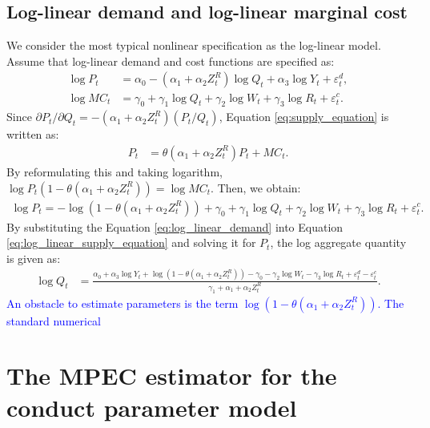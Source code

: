 \documentclass[11pt, a4paper]{article}
\begin{document}
\subsection{Log-linear demand and log-linear marginal cost}
We consider the most typical nonlinear specification as the log-linear model.
Assume that log-linear demand and cost functions are specified as:
\begin{align}
    \log P_{t} &= \alpha_0 - (\alpha_1 + \alpha_2 Z^{R}_{t}) \log Q_t + \alpha_3 \log Y_t + \varepsilon^{d}_{t},\label{eq:log_linear_demand}\\
    \log MC_t &= \gamma_0 + \gamma_1 \log Q_t +  \gamma_2 \log W_{t} + \gamma_3 \log R_t + \varepsilon^{c}_{t}.\label{eq:log_linear_marginal_cost}
\end{align}
Since $\partial P_t/\partial Q_t = - (\alpha_1 + \alpha_2 Z_{t}^R) (P_t/Q_t) $, Equation \eqref{eq:supply_equation} is written as:
\begin{align}
    P_t &= \theta (\alpha_1 + \alpha_2 Z^{R}_{t}) P_t + MC_t.
\end{align}
By reformulating this and taking logarithm, $\log P_t(1 -\theta (\alpha_1 + \alpha_2 Z^{R}_{t})) = \log MC_t.$
Then, we obtain:
\begin{align}
    \log P_t = - \log(1 - \theta(\alpha_1 + \alpha_2 Z^{R}_{t})) + \gamma_0 + \gamma_1 \log Q_t +  \gamma_2 \log W_{t} + \gamma_3 \log R_t + \varepsilon^{c}_{t}. \label{eq:log_linear_supply_equation}
\end{align}
By substituting the Equation \eqref{eq:log_linear_demand} into Equation \eqref{eq:log_linear_supply_equation} and solving it for $P_{t}$, the log aggregate quantity is given as: 
\begin{align}
    \log Q_t &= \frac{ \alpha_0 + \alpha_3 \log Y_t + \log (1 - \theta (\alpha_1 + \alpha_2 Z^{R}_{t})) - \gamma_0  -  \gamma_2 \log W_{t} - \gamma_3 \log R_t + \varepsilon^{d}_{t} - \varepsilon^{c}_{t}}{\gamma_1+ \alpha_1 + \alpha_2 Z^{R}_{t} }.\label{eq:quantity_loglinear}
\end{align}
\textcolor{blue}{An obstacle to estimate  parameters is the term $\log (1 - \theta (\alpha_1 + \alpha_2 Z^{R}_{t}))$. The standard numerical}

\section{The MPEC estimator for the conduct parameter model}
\end{document}
